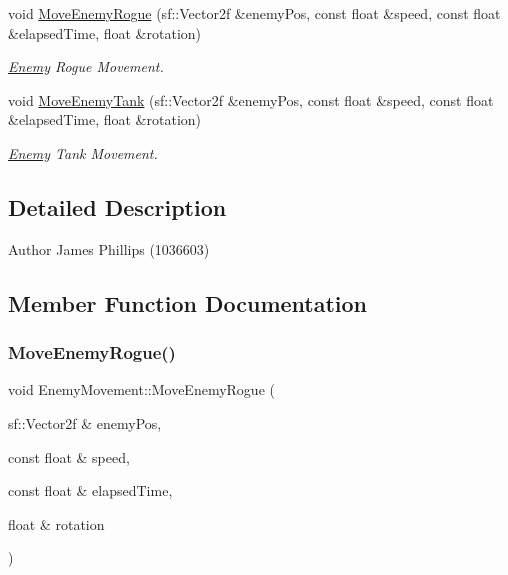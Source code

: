 \begin{DoxyCompactItemize}
void \hyperlink{class_enemy_movement_a6e09641ef866d6a45c6ef342c905bc14}{Move\+Enemy\+Rogue} (sf\+::\+Vector2f \&enemy\+Pos, const float \&speed, const float \&elapsed\+Time, float \&rotation)
\begin{DoxyCompactList}\small\item\em \hyperlink{class_enemy}{Enemy} Rogue Movement. \end{DoxyCompactList}\item 
void \hyperlink{class_enemy_movement_a91bd4b4f91b62660728ca2f5ac5062fd}{Move\+Enemy\+Tank} (sf\+::\+Vector2f \&enemy\+Pos, const float \&speed, const float \&elapsed\+Time, float \&rotation)
\begin{DoxyCompactList}\small\item\em \hyperlink{class_enemy}{Enemy} Tank Movement. \end{DoxyCompactList}\end{DoxyCompactItemize}


\subsection{Detailed Description}
\begin{DoxyAuthor}{Author}
James Phillips (1036603) 
\end{DoxyAuthor}


\subsection{Member Function Documentation}
\mbox{\label{class_enemy_movement_a6e09641ef866d6a45c6ef342c905bc14}} 
\subsubsection{\texorpdfstring{Move\+Enemy\+Rogue()}{MoveEnemyRogue()}}
{\footnotesize\ttfamily void Enemy\+Movement\+::\+Move\+Enemy\+Rogue (\begin{DoxyParamCaption}\item[{sf\+::\+Vector2f \&}]{enemy\+Pos,  }\item[{const float \&}]{speed,  }\item[{const float \&}]{elapsed\+Time,  }\item[{float \&}]{rotation }\end{DoxyParamCaption})}




